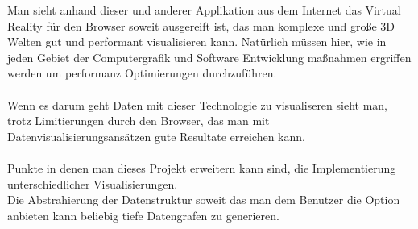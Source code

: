 
Man sieht anhand dieser und anderer Applikation aus dem Internet das Virtual Reality für den Browser soweit ausgereift ist, das man
komplexe und große 3D Welten gut und performant visualisieren kann. Natürlich müssen hier, wie in jeden Gebiet der Computergrafik und
Software Entwicklung maßnahmen ergriffen werden um performanz Optimierungen durchzuführen.\\ \\
Wenn es darum geht Daten mit dieser Technologie zu visualiseren sieht man, trotz Limitierungen durch den Browser, das man mit 
Datenvisualisierungsansätzen gute Resultate erreichen kann. \\ \\
Punkte in denen man dieses Projekt erweitern kann sind, die Implementierung unterschiedlicher Visualisierungen. \\
Die Abstrahierung der Datenstruktur soweit das man dem Benutzer die Option anbieten kann beliebig tiefe Datengrafen zu generieren.

